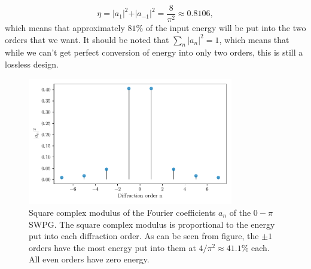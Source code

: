 \begin{equation}
	\eta=\rvert a_1\rvert^2 + \rvert a_{-1}\rvert^2 =\frac{8}{\pi^2}\approx 0.8106,
\end{equation} 
which means that approximately $81\%$ of the input energy will be put into the two orders that we want.  It should be noted that $\sum_{n}\rvert a_n\rvert^2=1$, which means that while we can't get perfect conversion of energy into only two orders, this is still a lossless design.
\begin{figure}
	\centering
	\includegraphics[width=0.8\textwidth]{figures/Two_source/a_n.pdf}
	\caption[Square modulus of Fourier coefficients of the $0-\pi$ SWPG]{Square complex modulus of the Fourier coefficients $a_n$ of the $0-\pi$ SWPG. The square complex modulus is proportional to the energy put into each diffraction order.  As can be seen from figure, the $\pm1$ orders have the most energy put into them at $4/\pi^2\approx41.1\%$ each.  All even orders have zero energy.}
	\label{fig:a_n}
\end{figure}

